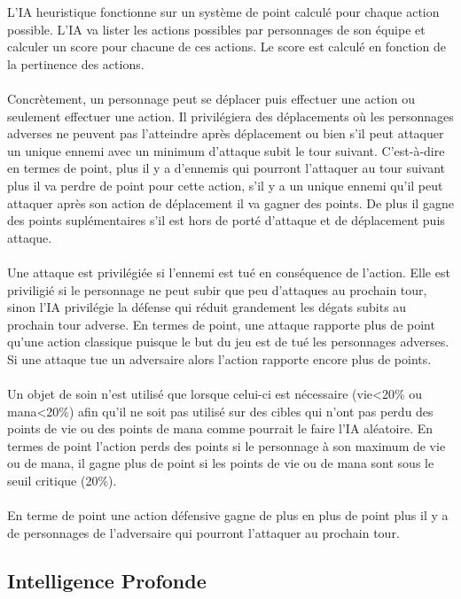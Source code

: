 L'IA heuristique fonctionne sur un système de point calculé pour 
chaque action possible.
L'IA va lister les actions possibles par personnages de son équipe et 
calculer un score pour chacune de ces actions.
Le score est calculé en fonction de la pertinence des actions.
\\\\
Concrètement, un personnage peut se déplacer puis effectuer une 
action ou seulement effectuer une action.
Il privilégiera des déplacements où les personnages adverses ne 
peuvent pas l'atteindre après déplacement ou bien s'il peut attaquer 
un unique ennemi avec un minimum d'attaque subit le tour suivant. 
C'est-à-dire en termes de point, plus il y a d'ennemis qui pourront 
l'attaquer au tour suivant plus il va perdre de point pour cette 
action, s'il y a un unique ennemi qu'il peut attaquer après son 
action de déplacement il va gagner des points. De plus il gagne des 
points suplémentaires s'il est hors de porté d'attaque et de 
déplacement puis attaque.
\\\\
Une attaque est privilégiée si l'ennemi est tué en conséquence de
l'action. Elle est priviligié si le personnage ne peut subir que peu 
d'attaques au prochain tour, sinon l'IA privilégie la défense qui réduit
grandement les dégats subits au prochain tour adverse.
En termes de point, une attaque rapporte plus de point qu'une action 
classique puisque le but du jeu est de tué les personnages adverses. 
Si une attaque tue un adversaire alors l'action rapporte encore plus 
de points.
\\\\
Un objet de soin n'est utilisé que lorsque celui-ci est nécessaire 
(vie<20\% ou mana<20\%) afin qu'il ne soit pas utilisé sur des cibles 
qui n'ont pas perdu des points de vie ou des points de mana comme 
pourrait le faire l'IA aléatoire.
En termes de point l'action perds des points si le personnage à son 
maximum de vie ou de mana, il gagne plus de point si les points de 
vie ou de mana sont sous le seuil critique (20\%).
\\\\
En terme de point une action défensive gagne de plus en plus de point plus il y a de personnages de l'adversaire qui pourront l'attaquer au prochain tour.
\\
\subsection{Intelligence Profonde}

